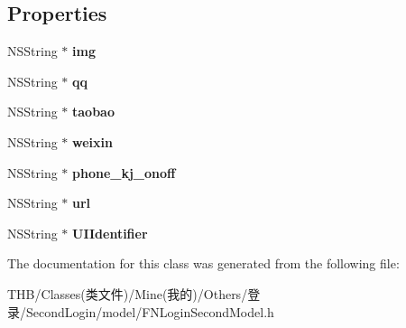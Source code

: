 \subsection*{Properties}
\begin{DoxyCompactItemize}
\item 
\mbox{\label{interface_f_n_login_second_model_a79ac01f9deb7891863796b1c50d97819}} 
N\+S\+String $\ast$ {\bfseries img}
\item 
\mbox{\label{interface_f_n_login_second_model_ae4e3461fecee49d57308770b54a62ec3}} 
N\+S\+String $\ast$ {\bfseries qq}
\item 
\mbox{\label{interface_f_n_login_second_model_addda806ef4983124caaa8e4f6f08db78}} 
N\+S\+String $\ast$ {\bfseries taobao}
\item 
\mbox{\label{interface_f_n_login_second_model_a95872a435a79516887244db211f3892e}} 
N\+S\+String $\ast$ {\bfseries weixin}
\item 
\mbox{\label{interface_f_n_login_second_model_a024567a31e5bacb8ad43049debc06c66}} 
N\+S\+String $\ast$ {\bfseries phone\+\_\+kj\+\_\+onoff}
\item 
\mbox{\label{interface_f_n_login_second_model_a2f903e482c16dfb9cbc028fa5ec8d2e2}} 
N\+S\+String $\ast$ {\bfseries url}
\item 
\mbox{\label{interface_f_n_login_second_model_aafd48524a71249131b8b437ac5de8d68}} 
N\+S\+String $\ast$ {\bfseries U\+I\+Identifier}
\end{DoxyCompactItemize}


The documentation for this class was generated from the following file\+:\begin{DoxyCompactItemize}
\item 
T\+H\+B/\+Classes(类文件)/\+Mine(我的)/\+Others/登录/\+Second\+Login/model/F\+N\+Login\+Second\+Model.\+h\end{DoxyCompactItemize}
